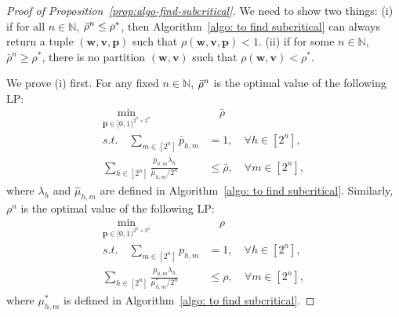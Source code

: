 \documentclass[11pt, reqno]{article}
\numberwithin{equation}{section}
\numberwithin{theorem}{section}
\newcommand{\N}{\mathbb{N}}                 %
\begin{document}
\begin{proof}[Proof of Proposition~\ref{prop:algo-find-subcritical}]
We need to show two things: (i) if for all $n\in\N$, $\Bar{\rho}^n\leq \rho^*$, then Algorithm~\ref{algo: to find subcritical} can always return a tuple $(\mathbf{w},\mathbf{v},\mathbf{p})$ such that $\rho(\mathbf{w},\mathbf{v},\mathbf{p})<1$. (ii) if for some $n\in\N$, $\bar{\rho}^n\ge\rho^*$, there is no partition $(\mathbf{w},\mathbf{v})$ such that $\rho(\mathbf{w},\mathbf{v})<\rho^*$. 

We prove (i) first. For any fixed $n\in\N$, $\Bar{\rho}^n$ is the optimal value of the following LP:
    \begin{align}\label{ref:lp-hat-mu}
        \min_{\bar{\mathbf{p}}\in[0,1)^{2^n\times 2^n}}&\quad \bar{\rho}\nonumber\\
        s.t.\quad \sum_{m\in[2^n]}\bar{p}_{h,m}&=1,\quad \forall h\in[2^n],\\
        \sum_{h\in[2^n]}\frac{\bar{p}_{h,m}\lambda_h}{\hat{\mu}_{h,m}/2^n}&\leq \bar{\rho},\quad \forall m\in[2^n],\nonumber
    \end{align}
    where $\lambda_h$ and $\hat{\mu}_{h,m}$ are defined in Algorithm~\ref{algo: to find subcritical}. 
    Similarly, $\rho^n$ is the optimal value of the following LP:
    \begin{align}\label{ref:lp-mu*}
        \min_{\mathbf{p}\in[0,1)^{2^n\times 2^n}}&\quad \rho\nonumber\\
        s.t.\quad \sum_{m\in[2^n]}p_{h,m}&=1,\quad \forall h\in[2^n],\\
        \sum_{h\in[2^n]}\frac{p_{h,m}\lambda_h}{\mu^*_{h,m}/2^n}&\leq \rho,\quad \forall m\in[2^n],\nonumber
    \end{align}
    where $\mu^*_{h,m}$ is defined in Algorithm~\ref{algo: to find subcritical}. 
    

\end{proof}
\end{document}
